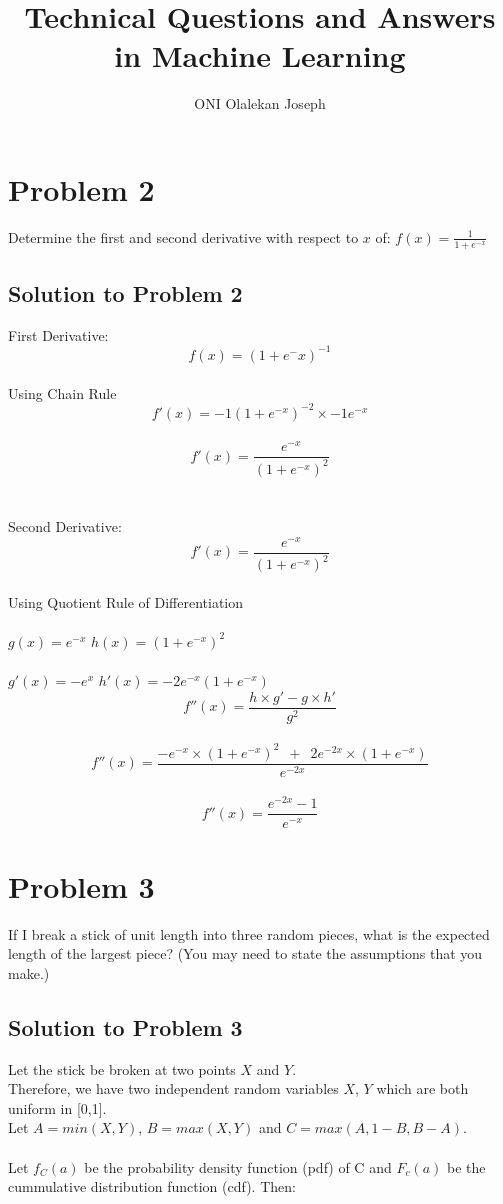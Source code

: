 \documentclass{article}
\begin{document}
\title{Technical Questions and Answers in Machine Learning}
\author{ONI Olalekan Joseph}

\maketitle

\section{Problem 2}
Determine the first and second derivative with respect to $x$ of: $f(x)= \frac{1}{1 + e^{-x}} $

\subsection{Solution to Problem 2}
 First Derivative: \\
 $$f(x) = (1 + e^-x)^{-1}$$ \\
 Using Chain Rule \\
 $$f'(x) = -1(1 + e^{-x})^{-2} \times -1e^{-x}$$ \\
 $$f'(x) = \frac{e^{-x}}{(1 + e^{-x})^{2}}$$ \\ \\
 
\noindent Second Derivative:  \\
 $$f'(x) = \frac{e^{-x}}{(1 + e^{-x})^{2}}$$ \\
 Using Quotient Rule of Differentiation \\ \\
 $g(x) = e^{-x}$  \qquad  $h(x) = (1 + e^{-x})^{2} $ \\\\
 $ g'(x) = -e^{x} $ \qquad $h'(x) = -2e^{-x}(1 + e^{-x}) $ \\
 $$f''(x) = \frac{h \times g' - g \times h' }{g^2} $$ \\
 $$f''(x) = \frac{-e^{-x} \times (1 + e^{-x})^{2} \enspace + \enspace 2e^{-2x} \times (1 + e^{-x})}{e^{-2x}} $$\\
 $$f''(x) = \frac{e^{-2x} - 1}{e^{-x}} $$
 
\section{Problem 3}
 If I break a stick of unit length into three random pieces, what is the expected length of the largest piece? (You may need to state the assumptions that you make.)
 
\subsection{Solution to Problem 3}
Let the stick be broken at two points $X$ and $Y$. \\
Therefore, we have two independent random variables $X$, $Y$ which are both uniform in [0,1]. \\
Let $A=min(X,Y)$, $B=max(X,Y)$ and $C=max(A,1-B,B-A)$. \\ \\
Let $f_{C}(a)$ be the probability density function (pdf) of C and $ F_{c}(a)$ be the cummulative distribution function (cdf). Then: 
\end{document}
